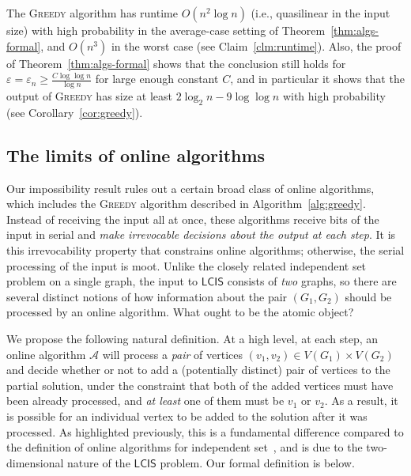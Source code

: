 \documentclass[11pt]{article}
\theoremstyle{plain}
\theoremstyle{definition}
\theoremstyle{remark}
\newcommand{\greedy}{\textsc{Greedy} }
\newcommand{\eps}{\varepsilon}
\newcommand{\MCS}{\mathsf{LCIS}}
\newcommand{\Alg}{\mathcal{A}}
\begin{document}
The \greedy algorithm has runtime $O(n^{2} \log n)$ (i.e., quasilinear in the input size) with high probability in the average-case setting of Theorem~\ref{thm:algs-formal}, and $O(n^{3})$ in the worst case (see Claim~\ref{clm:runtime}). 
Also, the proof of Theorem~\ref{thm:algs-formal} shows that the conclusion still holds for $\eps = \eps_{n} \geq \frac{C \log \log n}{\log n}$ for large enough constant $C$, 
and in particular it shows that the output of \greedy has size at least $2 \log_2 n - 9 \log \log n$ with high probability (see Corollary~\ref{cor:greedy}). 


\subsection{The limits of online algorithms}\label{sec:impossibility_results}

Our impossibility result rules out a certain broad class of online algorithms, which includes the \greedy algorithm described in Algorithm~\ref{alg:greedy}. Instead of receiving the input all at once, these algorithms receive bits of the input in serial and \emph{make irrevocable decisions about the output at each step}. It is this irrevocability property that constrains online algorithms; otherwise, the serial processing of the input is moot. Unlike the closely related independent set problem on a single graph, the input to $\MCS$ consists of \emph{two} graphs, so there are several distinct notions of how information about the pair $(G_1, G_2)$ should be processed by an online algorithm. What ought to be the atomic object? 

We propose the following natural definition. At a high level, at each step, an online algorithm $\Alg$ will process a \emph{pair} of vertices $(v_1, v_2) \in V(G_1) \times V(G_2)$ and decide whether or not to add a (potentially distinct) pair of vertices to the partial solution, under the constraint that both of the added vertices must have been already processed, and \emph{at least} one of them must be $v_1$ or $v_2$. As a result, it is possible for an individual vertex to be added to the solution after it was processed. As highlighted previously, this is a fundamental difference compared to the definition of online algorithms for independent set~\cite{GKW25}, and is due to the two-dimensional nature of the $\MCS$ problem. Our formal definition is below.
\end{document}

